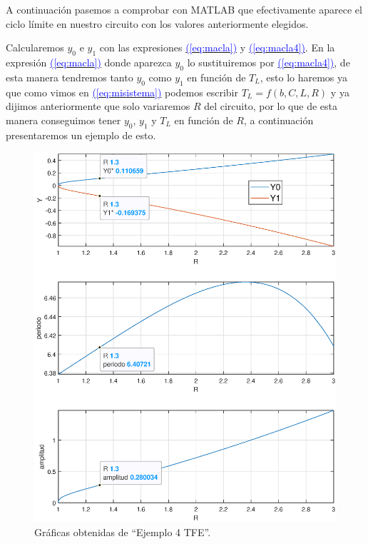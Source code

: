 \documentclass[12pt,a4paper]{report} %
\newcommand{\eref}[1]{\hyperref[#1]{\textcolor{blue}{(\ref*{#1})}}}
\newcommand{\eref}[1]{\hyperref[#1]{\textcolor{blue}{\textit{(\ref*{#1})}}}}
\begin{document}
	\vspace{0.5cm} A continuación pasemos a comprobar con MATLAB que efectivamente aparece el ciclo límite en nuestro circuito con los valores anteriormente elegidos.
	
	 \vspace{0.5cm}\noindent Calcularemos $y_0$ e $y_1$ con las expresiones \eref{eq:macla} y \eref{eq:macla4}. En la expresión \eref{eq:macla} donde aparezca $y_0$ lo sustituiremos por \eref{eq:macla4}, de esta manera tendremos tanto $y_0$ como $y_1$ en función de $T_L$, esto lo haremos ya que como vimos en \eref{eq:misistema} podemos escribir $T_L=f(b,C,L,R)$ y ya dijimos anteriormente que solo variaremos $R$ del circuito, por lo que de esta manera conseguimos tener $y_0$, $y_1$ y $T_L$ en función de $R$, a continuación presentaremos un ejemplo de esto.
	
	\newpage
	
	
	
	\newpage
	
	
	
	\newpage

	\begin{figure}[h]
	\centering
	\includegraphics[width=1\textwidth]{ejem4amplitud.eps}
	\caption{Gráficas obtenidas de ``Ejemplo 4 TFE''.}
	\label{fig:ejem4}
	\end{figure}\smallskip
\end{document}
